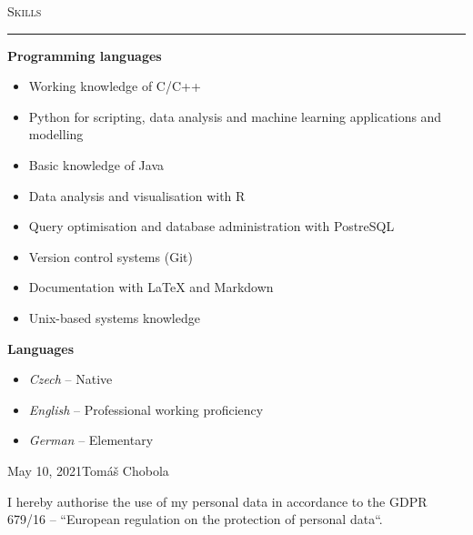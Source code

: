 \documentclass[10pt]{article}
\begin{document}
\begin{Large}
    \textsc{Skills}
    \vspace{0.4em}
    \hrule
    \vspace{0.4em}
\end{Large}
\begin{normalsize}
    \textbf{Programming languages}
    \begin{itemize}\itemsep -2pt %
        \item Working knowledge of C/C++
        \item Python for scripting, data analysis and machine learning applications and modelling
        \item Basic knowledge of Java
        \item Data analysis and visualisation with R
        \item Query optimisation and database administration with PostreSQL
        \item Version control systems (Git)
        \item Documentation with LaTeX and Markdown
        \item Unix-based systems knowledge
    \end{itemize}
    
    \textbf{Languages}
    \begin{itemize}\itemsep -2pt %
        \item \textit{Czech} -- Native
        \item \textit{English} -- Professional working proficiency
        \item \textit{German} -- Elementary
    \end{itemize}
\end{normalsize}


\vspace{290pt}
\hfill May 10, 2021\hspace{1cm}Tomáš Chobola
\vspace{10pt}

I hereby authorise the use of my personal data in accordance to the GDPR 679/16 – “European regulation on the protection of personal data``.
\end{document}
